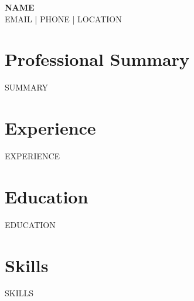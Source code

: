 \documentclass[11pt,a4paper]{article}
\begin{document}
\begin{center}
{\Huge \textbf{{{NAME}}}}\\
{{EMAIL}} | {{PHONE}} | {{LOCATION}}
\end{center}

\section*{Professional Summary}
{{SUMMARY}}

\section*{Experience}
{{EXPERIENCE}}

\section*{Education}
{{EDUCATION}}

\section*{Skills}
{{SKILLS}}
\end{document}
